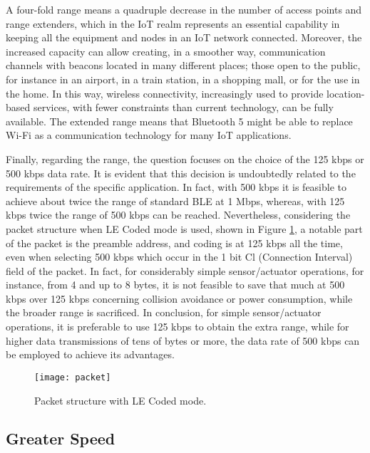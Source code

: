 \documentclass[12pt, draftclsnofoot, onecolumn]{IEEEtran}
\begin{document}
A four-fold range means a quadruple decrease in the number of access points and range extenders, which in the IoT realm represents an essential capability in keeping all the equipment and nodes in an IoT network connected. Moreover, the increased capacity can allow creating, in a smoother way, communication channels with beacons located in many different places; those open to the public, for instance in an airport, in a train station, in a shopping mall, or for the use in the home. In this way, wireless connectivity, increasingly used to provide location-based services, with fewer constraints than current technology, can be fully available. The extended range means that Bluetooth 5 might be able to replace Wi-Fi as a communication technology for many IoT applications.

Finally, regarding the range, the question focuses on the choice of the 125 kbps or 500 kbps data rate. It is evident that this decision is undoubtedly related to the requirements of the specific application. In fact, with 500 kbps it is feasible to achieve about twice the range of standard BLE at 1 Mbps, whereas, with 125 kbps twice the range of 500 kbps can be reached. Nevertheless, considering the packet structure when LE Coded mode is used, shown in Figure \ref{fig:packet}, a notable part of the packet is the preamble address, and coding is at 125 kbps all the time, even when selecting 500 kbps which occur in the 1 bit Cl (Connection Interval) field of the packet. In fact, for considerably simple sensor/actuator operations, for instance, from 4 and up to 8 bytes, it is not feasible to save that much at 500 kbps over 125 kbps concerning collision avoidance or power consumption, while the broader range is sacrificed. In conclusion, for simple sensor/actuator operations, it is preferable to use 125 kbps to obtain the extra range, while for higher data transmissions of tens of bytes or more, the data rate of 500 kbps can be employed to achieve its advantages.

\begin{figure}
	\centering
	\texttt{[image: packet]}
	\caption{Packet structure with LE Coded mode.}
	\label{fig:packet}
\end{figure}

\subsection{Greater Speed}
\label{subsec:speed}
\end{document}
